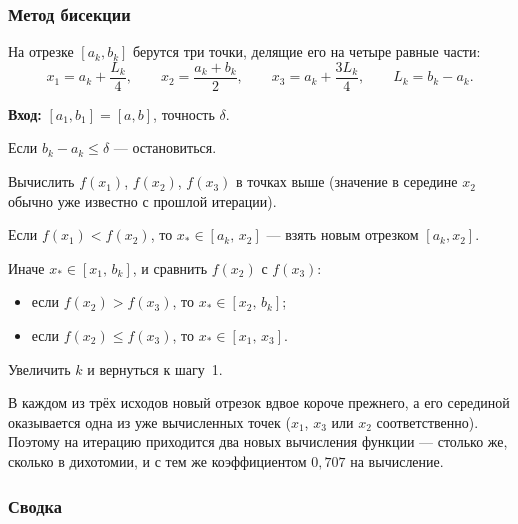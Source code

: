 \subsubsection*{Метод бисекции}

На отрезке $[a_k, b_k]$ берутся три точки, делящие его на четыре равные части:
\[
  x_1 = a_k + \frac{L_k}{4}, \qquad
  x_2 = \frac{a_k + b_k}{2}, \qquad
  x_3 = a_k + \frac{3L_k}{4},
  \qquad L_k = b_k - a_k .
\]

\begin{algo}[title={Метод бисекции}]
\textbf{Вход:} $[a_1,b_1] = [a,b]$, точность $\delta$.

\begin{steps}
  \item Если $b_k - a_k \le \delta$ — остановиться.
  \item Вычислить $f(x_1)$, $f(x_2)$, $f(x_3)$ в точках выше (значение в
        середине $x_2$ обычно уже известно с прошлой итерации).
  \item Если $f(x_1) < f(x_2)$, то $x_* \in [a_k,\, x_2]$ — взять новым
        отрезком $[a_k, x_2]$.
  \item Иначе $x_* \in [x_1,\, b_k]$, и сравнить $f(x_2)$ с $f(x_3)$:
        \begin{itemize}[leftmargin=1.4em, topsep=2pt]
          \item если $f(x_2) > f(x_3)$, то $x_* \in [x_2,\, b_k]$;
          \item если $f(x_2) \le f(x_3)$, то $x_* \in [x_1,\, x_3]$.
        \end{itemize}
  \item Увеличить $k$ и вернуться к шагу~1.
\end{steps}
\end{algo}

\begin{idea}
В каждом из трёх исходов новый отрезок вдвое короче прежнего, а его серединой
оказывается одна из уже вычисленных точек ($x_1$, $x_3$ или $x_2$
соответственно). Поэтому на итерацию приходится два новых вычисления функции —
столько же, сколько в дихотомии, и с тем же коэффициентом $0{,}707$ на
вычисление.
\end{idea}

\subsubsection*{Сводка}

